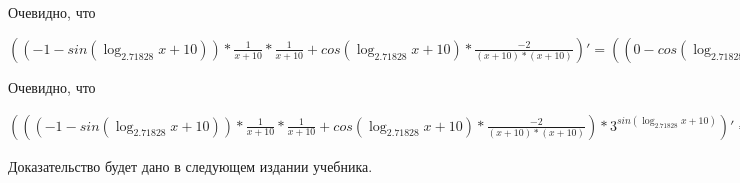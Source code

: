 \documentclass[12pt,a4paper,fleqn]{article}
\theoremstyle{definition}
\begin{document}
Очевидно, что

$(( -1  - sin(\log_{ 2.71828 }{ x  +  10 })) * \frac{ 1 }{ x  +  10 }
 * \frac{ 1 }{ x  +  10 }
 + cos(\log_{ 2.71828 }{ x  +  10 }) * \frac{ -2 }{( x  +  10 ) * ( x  +  10 )}
)' = (( 0  - cos(\log_{ 2.71828 }{ x  +  10 }) * \frac{ 1  +  0 }{\log_{ 2.71828 }{ 2.71828 } * ( x  +  10 )}
) * \frac{ 1 }{ x  +  10 }
 + ( -1  - sin(\log_{ 2.71828 }{ x  +  10 })) * \frac{ 0  * ( x  +  10 ) -  1  * ( 1  +  0 )}{( x  +  10 ) * ( x  +  10 )}
) * \frac{ 1 }{ x  +  10 }
 + ( -1  - sin(\log_{ 2.71828 }{ x  +  10 })) * \frac{ 1 }{ x  +  10 }
 * \frac{ 0  * ( x  +  10 ) -  1  * ( 1  +  0 )}{( x  +  10 ) * ( x  +  10 )}
 + ( -1  - sin(\log_{ 2.71828 }{ x  +  10 })) * \frac{ 1  +  0 }{\log_{ 2.71828 }{ 2.71828 } * ( x  +  10 )}
 * \frac{ -2 }{( x  +  10 ) * ( x  +  10 )}
 + cos(\log_{ 2.71828 }{ x  +  10 }) * \frac{ 0  * ( x  +  10 ) * ( x  +  10 ) -  -2  * (( 1  +  0 ) * ( x  +  10 ) + ( x  +  10 ) * ( 1  +  0 ))}{( x  +  10 ) * ( x  +  10 ) * ( x  +  10 ) * ( x  +  10 )}
$

Очевидно, что

$((( -1  - sin(\log_{ 2.71828 }{ x  +  10 })) * \frac{ 1 }{ x  +  10 }
 * \frac{ 1 }{ x  +  10 }
 + cos(\log_{ 2.71828 }{ x  +  10 }) * \frac{ -2 }{( x  +  10 ) * ( x  +  10 )}
) * { 3 }^{sin(\log_{ 2.71828 }{ x  +  10 })})' = ((( 0  - cos(\log_{ 2.71828 }{ x  +  10 }) * \frac{ 1  +  0 }{\log_{ 2.71828 }{ 2.71828 } * ( x  +  10 )}
) * \frac{ 1 }{ x  +  10 }
 + ( -1  - sin(\log_{ 2.71828 }{ x  +  10 })) * \frac{ 0  * ( x  +  10 ) -  1  * ( 1  +  0 )}{( x  +  10 ) * ( x  +  10 )}
) * \frac{ 1 }{ x  +  10 }
 + ( -1  - sin(\log_{ 2.71828 }{ x  +  10 })) * \frac{ 1 }{ x  +  10 }
 * \frac{ 0  * ( x  +  10 ) -  1  * ( 1  +  0 )}{( x  +  10 ) * ( x  +  10 )}
 + ( -1  - sin(\log_{ 2.71828 }{ x  +  10 })) * \frac{ 1  +  0 }{\log_{ 2.71828 }{ 2.71828 } * ( x  +  10 )}
 * \frac{ -2 }{( x  +  10 ) * ( x  +  10 )}
 + cos(\log_{ 2.71828 }{ x  +  10 }) * \frac{ 0  * ( x  +  10 ) * ( x  +  10 ) -  -2  * (( 1  +  0 ) * ( x  +  10 ) + ( x  +  10 ) * ( 1  +  0 ))}{( x  +  10 ) * ( x  +  10 ) * ( x  +  10 ) * ( x  +  10 )}
) * { 3 }^{sin(\log_{ 2.71828 }{ x  +  10 })} + (( -1  - sin(\log_{ 2.71828 }{ x  +  10 })) * \frac{ 1 }{ x  +  10 }
 * \frac{ 1 }{ x  +  10 }
 + cos(\log_{ 2.71828 }{ x  +  10 }) * \frac{ -2 }{( x  +  10 ) * ( x  +  10 )}
) * \log_{ 2.71828 }{ 3 } * cos(\log_{ 2.71828 }{ x  +  10 }) * \frac{ 1  +  0 }{\log_{ 2.71828 }{ 2.71828 } * ( x  +  10 )}
 * { 3 }^{sin(\log_{ 2.71828 }{ x  +  10 })}$

Доказательство будет дано в следующем издании учебника.
\end{document}
